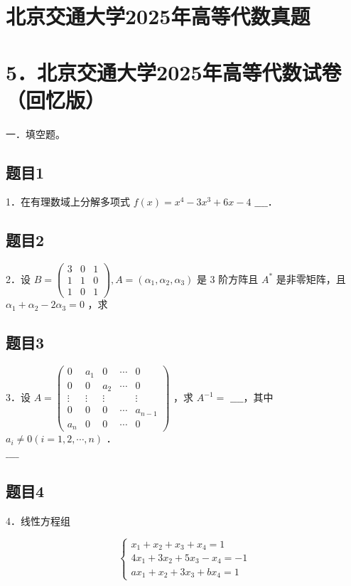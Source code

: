 \documentclass{article}
\begin{document}
\section*{北京交通大学2025年高等代数真题}
\section*{5．北京交通大学2025年高等代数试卷（回忆版）}
一．填空题。\\

\subsection{题目1}
1．在有理数域上分解多项式 \(f(x)=x^{4}-3 x^{3}+6 x-4\) \(\_\_\_\_\)．

\subsection{题目2}
2．设 \(B=\left(\begin{array}{lll}3 & 0 & 1 \\ 1 & 1 & 0 \\ 1 & 0 & 1\end{array}\right), A=\left(\alpha_{1}, \alpha_{2}, \alpha_{3}\right)\) 是 3 阶方阵且 \(A^{*}\) 是非零矩阵，且 \(\alpha_{1}+\alpha_{2}-2 \alpha_{3}=0\) ，求

\subsection{题目3}
3．设 \(A=\left(\begin{array}{ccccc}0 & a_{1} & 0 & \cdots & 0 \\ 0 & 0 & a_{2} & \cdots & 0 \\ \vdots & \vdots & \vdots & & \vdots \\ 0 & 0 & 0 & \cdots & a_{n-1} \\ a_{n} & 0 & 0 & \cdots & 0\end{array}\right)\) ，求 \(A^{-1}=\) \(\_\_\_\_\)，其中 \(a_{i} \neq 0(i=1,2, \cdots, n)\) ．\\
\(\_\_\_\_\)

\subsection{题目4}
4．线性方程组

\[
\left\{\begin{array}{l}
x_{1}+x_{2}+x_{3}+x_{4}=1 \\
4 x_{1}+3 x_{2}+5 x_{3}-x_{4}=-1 \\
a x_{1}+x_{2}+3 x_{3}+b x_{4}=1
\end{array}\right.
\]
\end{document}

